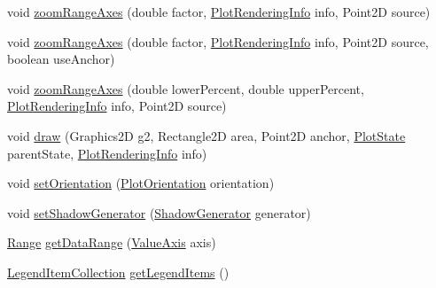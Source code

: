 \begin{DoxyCompactItemize}
void \mbox{\hyperlink{classorg_1_1jfree_1_1chart_1_1plot_1_1_combined_domain_category_plot_a7518473f9d33ae6ee055e2045ff4faec}{zoom\+Range\+Axes}} (double factor, \mbox{\hyperlink{classorg_1_1jfree_1_1chart_1_1plot_1_1_plot_rendering_info}{Plot\+Rendering\+Info}} info, Point2D source)
\item 
void \mbox{\hyperlink{classorg_1_1jfree_1_1chart_1_1plot_1_1_combined_domain_category_plot_a83fc502df5988f7ac9e6483c8cd72657}{zoom\+Range\+Axes}} (double factor, \mbox{\hyperlink{classorg_1_1jfree_1_1chart_1_1plot_1_1_plot_rendering_info}{Plot\+Rendering\+Info}} info, Point2D source, boolean use\+Anchor)
\item 
void \mbox{\hyperlink{classorg_1_1jfree_1_1chart_1_1plot_1_1_combined_domain_category_plot_adea639250417566ee06ca52727c781f9}{zoom\+Range\+Axes}} (double lower\+Percent, double upper\+Percent, \mbox{\hyperlink{classorg_1_1jfree_1_1chart_1_1plot_1_1_plot_rendering_info}{Plot\+Rendering\+Info}} info, Point2D source)
\item 
void \mbox{\hyperlink{classorg_1_1jfree_1_1chart_1_1plot_1_1_combined_domain_category_plot_a5c12a31d133d4fa05fe7a4e5e8be15e8}{draw}} (Graphics2D g2, Rectangle2D area, Point2D anchor, \mbox{\hyperlink{classorg_1_1jfree_1_1chart_1_1plot_1_1_plot_state}{Plot\+State}} parent\+State, \mbox{\hyperlink{classorg_1_1jfree_1_1chart_1_1plot_1_1_plot_rendering_info}{Plot\+Rendering\+Info}} info)
\item 
void \mbox{\hyperlink{classorg_1_1jfree_1_1chart_1_1plot_1_1_combined_domain_category_plot_ae0c4fbaa5588c5708476c0344e7d3044}{set\+Orientation}} (\mbox{\hyperlink{classorg_1_1jfree_1_1chart_1_1plot_1_1_plot_orientation}{Plot\+Orientation}} orientation)
\item 
void \mbox{\hyperlink{classorg_1_1jfree_1_1chart_1_1plot_1_1_combined_domain_category_plot_a88690d6523bf4567257f06f131d9d90c}{set\+Shadow\+Generator}} (\mbox{\hyperlink{interfaceorg_1_1jfree_1_1chart_1_1util_1_1_shadow_generator}{Shadow\+Generator}} generator)
\item 
\mbox{\hyperlink{classorg_1_1jfree_1_1data_1_1_range}{Range}} \mbox{\hyperlink{classorg_1_1jfree_1_1chart_1_1plot_1_1_combined_domain_category_plot_a128fef2bff06d3fbe79052b3546e9305}{get\+Data\+Range}} (\mbox{\hyperlink{classorg_1_1jfree_1_1chart_1_1axis_1_1_value_axis}{Value\+Axis}} axis)
\item 
\mbox{\hyperlink{classorg_1_1jfree_1_1chart_1_1_legend_item_collection}{Legend\+Item\+Collection}} \mbox{\hyperlink{classorg_1_1jfree_1_1chart_1_1plot_1_1_combined_domain_category_plot_ab1f03919631fb01fcc9c420ad61bfdb2}{get\+Legend\+Items}} ()

\end{DoxyCompactItemize}
